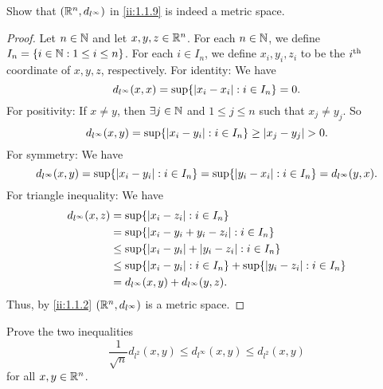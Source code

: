 \begin{ex}\label{ii:ex:1.1.9}
  Show that \((\mathbb{R}^n, d_{l^\infty})\) in \cref{ii:1.1.9} is indeed a metric space.
\end{ex}

\begin{proof}
  Let \(n \in \mathbb{N}\) and let \(x, y, z \in \mathbb{R}^n\).
  For each \(n \in \mathbb{N}\), we define \(I_n = \left\lbrace i \in \mathbb{N} : 1 \leq i \leq n\right\rbrace\).
  For each \(i \in I_n\), we define \(x_i, y_i, z_i\) to be the \(i^{\operatorname{th}}\) coordinate of \(x, y, z\), respectively.
  For identity:
  We have
  \[
    d_{l^\infty}(x, x) = \sup \set{\abs{x_i - x_i} : i \in I_n} = 0.
  \]
  For positivity:
  If \(x \neq y\), then \(\exists j \in \mathbb{N}\) and \(1 \leq j \leq n\) such that \(x_j \neq y_j\).
  So
  \[
    d_{l^\infty}(x, y) = \sup \set{\abs{x_i - y_i} : i \in I_n} \geq \abs{x_j - y_j} > 0.
  \]
  For symmetry:
  We have
  \[
    d_{l^\infty}(x, y) = \sup \set{\abs{x_i - y_i} : i \in I_n} = \sup \set{\abs{y_i - x_i} : i \in I_n} = d_{l^\infty}(y, x).
  \]
  For triangle inequality:
  We have
  \begin{align*}
    d_{l^\infty}(x, z) & = \sup \set{\abs{x_i - z_i} : i \in I_n}                                             \\
                       & = \sup \set{\abs{x_i - y_i + y_i - z_i} : i \in I_n}                                 \\
                       & \leq \sup \set{\abs{x_i - y_i} + \abs{y_i - z_i} : i \in I_n}                        \\
                       & \leq \sup \set{\abs{x_i - y_i} : i \in I_n} + \sup \set{\abs{y_i - z_i} : i \in I_n} \\
                       & = d_{l^\infty}(x, y) + d_{l^\infty}(y, z).
  \end{align*}
  Thus, by \cref{ii:1.1.2} \((\mathbb{R}^n, d_{l^\infty})\) is a metric space.
\end{proof}

\begin{ex}\label{ii:ex:1.1.10}
  Prove the two inequalities
  \[
    \dfrac{1}{\sqrt{n}} d_{l^2}(x, y) \leq d_{l^\infty}(x, y) \leq d_{l^2}(x, y)
  \]
  for all \(x, y \in \mathbb{R}^n\).
\end{ex}

